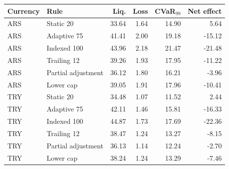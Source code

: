 \begin{tabular}{llrrrr}
\toprule
Currency & Rule & Liq. & Loss & CVaR$_{99}$ & Net effect \\
\midrule
ARS & Static 20 & 33.64 & 1.64 & 14.90 & 5.64 \\
ARS & Adaptive 75 & 41.41 & 2.00 & 19.18 & -15.12 \\
ARS & Indexed 100 & 43.96 & 2.18 & 21.47 & -21.48 \\
ARS & Trailing 12 & 39.26 & 1.93 & 17.95 & -11.22 \\
ARS & Partial adjustment & 36.12 & 1.80 & 16.21 & -3.96 \\
ARS & Lower cap & 39.05 & 1.91 & 17.96 & -10.41 \\
TRY & Static 20 & 34.48 & 1.07 & 11.52 & 2.44 \\
TRY & Adaptive 75 & 42.11 & 1.46 & 15.81 & -16.33 \\
TRY & Indexed 100 & 44.87 & 1.73 & 17.69 & -22.36 \\
TRY & Trailing 12 & 38.47 & 1.24 & 13.27 & -8.15 \\
TRY & Partial adjustment & 36.13 & 1.14 & 12.24 & -2.70 \\
TRY & Lower cap & 38.24 & 1.24 & 13.29 & -7.46 \\
\bottomrule
\end{tabular}
